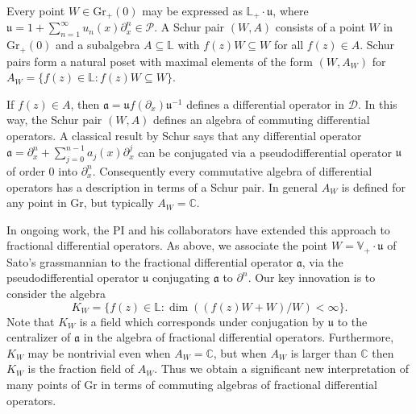 \documentclass[11pt,letterpaper]{article}
\theoremstyle{definition}
\newcommand{\bbc}{\mathbb{C}}
\newcommand{\Gr}{\text{Gr}}
\begin{document}
Every point $W\in\Gr_+(0)$ may be expressed as $\mathbb L_+\cdot\mathfrak u$, where $\mathfrak u = 1 + \sum_{n=1}^\infty u_n(x)\partial_x^n\in\mathcal P$.
A Schur pair $(W,A)$ consists of a point $W$ in $\Gr_+(0)$ and a subalgebra $A\subseteq \mathbb L$ with $f(z)W\subseteq W$ for all $f(z)\in A$.
Schur pairs form a natural poset with maximal elements of the form $(W,A_W)$ for $A_W = \{f(z)\in\mathbb L: f(z)W\subseteq W\}$.

If $f(z)\in A$, then $\mathfrak a = \mathfrak u f(\partial_x)\mathfrak u^{-1}$ defines a differential operator in $\mathcal D$.
In this way, the Schur pair $(W,A)$ defines an algebra of commuting differential operators.
A classical result by Schur \cite{schur} says that any differential operator $\mathfrak a = \partial_x^n + \sum_{j=0}^{n-1} a_j(x)\partial_x^j$ can be conjugated via a pseudodifferential operator $\mathfrak u$ of order $0$ into $\partial_x^n$.
Consequently every commutative algebra of differential operators has a description in terms of a Schur pair.
In general $A_W$ is defined for any point in $\Gr$, but typically $A_W=\bbc$.

In ongoing work, the PI and his collaborators have extended this approach to fractional differential operators.
As above, we associate the point $W=\mathbb V_+\cdot \mathfrak u$ of Sato's grassmannian to the fractional differential operator $\mathfrak a$, via the pseudodifferential operator $\mathfrak u$ conjugating $\mathfrak a$ to $\partial^n$.
Our key innovation is to consider the algebra
$$K_W = \{f(z)\in \mathbb L: \dim((f(z)W+W)/W) < \infty\}.$$
Note that $K_W$ is a field which corresponds under conjugation by $\mathfrak u$ to the centralizer of $\mathfrak a$ in the algebra of fractional differential operators.
Furthermore, $K_W$ may be nontrivial even when $A_W=\bbc$, but when $A_W$ is larger than $\bbc$ then $K_W$ is the fraction field of $A_W$.
Thus we obtain a significant new interpretation of many points of $\Gr$ in terms of commuting algebras of fractional differential operators.
\end{document}
